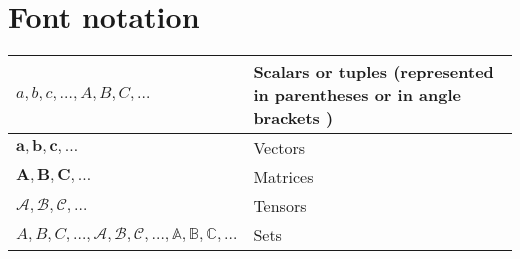 \section{Font notation}
\begin{xltabular}{\textwidth}{XX}
	$a,b,c, \dots, A, B, C, \dots$                                                                            & Scalars or tuples (represented in parentheses \cite{theodoridisMachineLearningBayesian2020} or in angle brackets \cite{brewkaArtificialIntelligenceModern1996})  \\ \hline
	$\mathbf{a}, \mathbf{b}, \mathbf{c}, \dots$                                                               & Vectors  \\ \hline
	$\mathbf{A}, \mathbf{B}, \mathbf{C}, \dots$                                                               & Matrices \\ \hline
	$\pmb{\mathcal{A}}, \pmb{\mathcal{B}}, \pmb{\mathcal{C}}, \dots$                                          & Tensors  \\ \hline
	$A, B, C, \dots, \mathcal{A}, \mathcal{B}, \mathcal{C}, \dots, \mathbb{A}, \mathbb{B}, \mathbb{C}, \dots$ & Sets     \\
\end{xltabular}